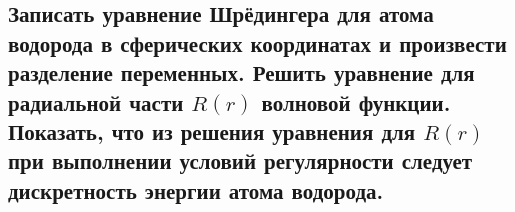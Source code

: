 \subsection{Записать уравнение Шрёдингера для атома водорода в сферических координатах и произвести
разделение переменных. Решить уравнение для радиальной части $R(r)$ волновой функции. Показать,
что из решения уравнения для $R(r)$ при выполнении условий регулярности следует дискретность
энергии атома водорода.}


